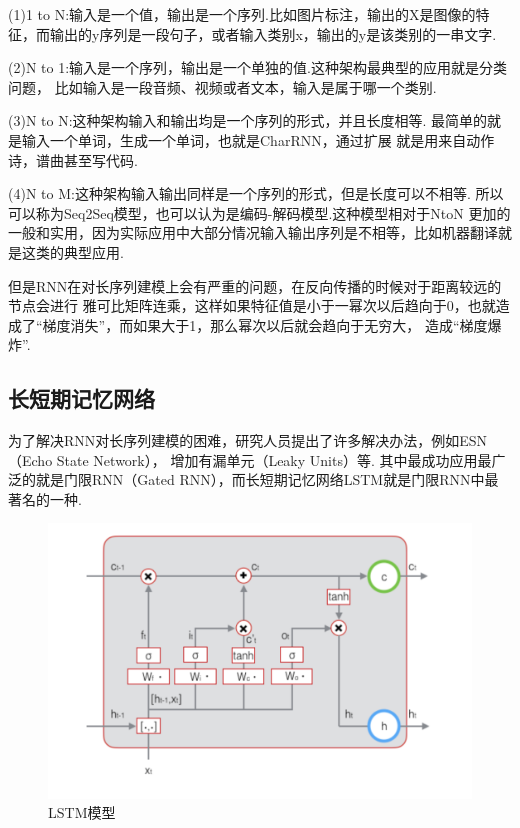 \documentclass[bachelor,adobefonts]{jnuthesis}
\begin{document}


(1)1 to N:输入是一个值，输出是一个序列.比如图片标注，输出的X是图像的特征，而输出的y序列是一段句子，或者输入类别x，输出的y是该类别的一串文字.

(2)N to 1:输入是一个序列，输出是一个单独的值.这种架构最典型的应用就是分类问题，
比如输入是一段音频、视频或者文本，输入是属于哪一个类别.


(3)N to N:这种架构输入和输出均是一个序列的形式，并且长度相等.
最简单的就是输入一个单词，生成一个单词，也就是CharRNN，通过扩展
就是用来自动作诗，谱曲甚至写代码.

(4)N to M:这种架构输入输出同样是一个序列的形式，但是长度可以不相等.
所以可以称为Seq2Seq模型，也可以认为是编码-解码模型.这种模型相对于NtoN
更加的一般和实用，因为实际应用中大部分情况输入输出序列是不相等，比如机器翻译就是这类的典型应用.

但是RNN在对长序列建模上会有严重的问题，在反向传播的时候对于距离较远的节点会进行
雅可比矩阵连乘，这样如果特征值是小于一幂次以后趋向于0，也就造成了“梯度消失”，而如果大于1，那么幂次以后就会趋向于无穷大，
造成“梯度爆炸”.

\subsection{长短期记忆网络}
为了解决RNN对长序列建模的困难，研究人员提出了许多解决办法，例如ESN（Echo State Network），
增加有漏单元（Leaky Units）等.
其中最成功应用最广泛的就是门限RNN（Gated RNN），而长短期记忆网络LSTM就是门限RNN中最著名的一种.

\begin{figure}[h!]
  \centering
  \includegraphics[width=0.6\linewidth]{LSTM.png}
  \caption{LSTM模型}
\end{figure}
\end{document}
